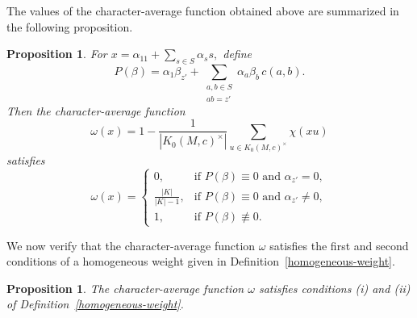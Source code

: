 \documentclass[11pt,reqno]{amsart}
\theoremstyle{plain}
\newtheorem{prop}[thm]{Proposition}
\theoremstyle{remark}
\theoremstyle{definition}
\begin{document}
The values of the character-average function obtained above are summarized in the following proposition.

\begin{prop}\label{PropCharacterAverage}
For
\(x=\alpha_11+\sum_{s\in S}\alpha_ss,\)
define
\[
P(\beta)
=
\alpha_1\beta_{z'}
+
\sum_{\substack{a,b\in S\\ab=z'}}
\alpha_a\beta_b\,c(a,b).
\]
Then the character-average function
\[
\omega(x)
=
1-
\frac{1}{|K_0(M,c)^{\times}|}
\sum_{u\in K_0(M,c)^{\times}}
\chi(xu)
\]
satisfies
\[
\omega(x)=
\begin{cases}
0,
&
\text{if }P(\beta)\equiv0\text{ and }\alpha_{z'}=0,\\[1ex]
\displaystyle
\frac{|K|}{|K|-1},
&
\text{if }P(\beta)\equiv0\text{ and }\alpha_{z'}\neq0,\\[2ex]
1,
&
\text{if }P(\beta)\not\equiv0.
\end{cases}
\]
\end{prop}

We now verify that the character-average function \(\omega\) satisfies the first and second conditions of a homogeneous weight given in Definition~\ref{homogeneous-weight}.

\begin{prop}\label{PropFirstTwoConditions}
The character-average function \(\omega\) satisfies conditions {\rm(i)} and {\rm(ii)} of Definition~\ref{homogeneous-weight}.
\end{prop}
\end{document}
